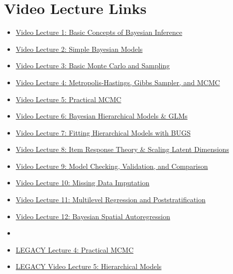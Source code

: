 \documentclass[11pt, leqno, fleqn]{article}
\begin{document}
\section*{Video Lecture Links}
\vspace{10pt}
\begin{itemize}
\item[] \href{http://youtu.be/BOWNHl3qOVA}{Video Lecture 1: Basic Concepts of Bayesian Inference} \\
\item[] \href{http://youtu.be/ps5MYi81IsE}{Video Lecture 2: Simple Bayesian Models} \\
\item[] \href{http://youtu.be/cxWzsCoYT8Q}{Video Lecture 3: Basic Monte Carlo and Sampling} \\
\item[] \href{http://youtu.be/j4nEAqUUnVw}{Video Lecture 4: Metropolis-Hastings, Gibbs Sampler, and MCMC} \\
\item[] \href{}{Video Lecture 5: Practical MCMC} \\
\item[] \href{}{Video Lecture 6: Bayesian Hierarchical Models \& GLMs} \\
\item[] \href{}{Video Lecture 7: Fitting Hierarchical Models with BUGS} \\
\item[] \href{}{Video Lecture 8: Item Response Theory \& Scaling Latent Dimensions} \\
\item[] \href{}{Video Lecture 9: Model Checking, Validation, and Comparison} \\
\item[] \href{}{Video Lecture 10: Missing Data Imputation} \\
\item[] \href{}{Video Lecture 11: Multilevel Regression and Poststratification} \\
\item[] \href{}{Video Lecture 12: Bayesian Spatial Autoregression} \\
\item[]
\item[] \href{http://youtu.be/bGKgkK9vETQ}{LEGACY Lecture 4: Practical MCMC} \\
\item[] \href{http://youtu.be/tbQkKu01kb8}{LEGACY Video Lecture 5: Hierarchical Models} \\

\end{itemize}
\end{document}
